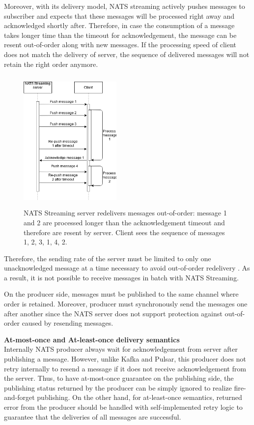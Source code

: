 Moreover, with its delivery model, NATS streaming actively pushes messages to subscriber and expects that these messages will be processed right away and acknowledged shortly after. Therefore, in case the consumption of a message takes longer time than the timeout for acknowledgement, the message can be resent out-of-order along with new messages. If the processing speed of client does not match the delivery of server, the sequence of delivered messages will not retain the right order anymore.
\begin{figure}[h]
	\centering
	\includegraphics[width=5cm,height=7cm]{images/order-nats.png}
	\caption{NATS Streaming server redelivers messages out-of-order: message 1 and 2 are processed longer than the acknowledgement timeout and therefore are resent by server. Client sees the sequence of messages 1, 2, 3, 1, 4, 2.}
	\label{fig:ordernats}
\end{figure}

Therefore, the sending rate of the server must be limited to only one unacknowledged message at a time necessary to avoid out-of-order redelivery \cite{natsdevelopingacks}. As a result, it is not possible to receive messages in batch with NATS Streaming. 

On the producer side, messages must be published to the same channel where order is retained. Moreover, producer must synchronously send the messages one after another since the NATS server does not support protection against out-of-order caused by resending messages.  

\textbf{At-most-once and At-least-once delivery semantics}\\
Internally NATS producer always wait for acknowledgement from server after publishing a message. However, unlike Kafka and Pulsar, this producer does not retry internally to resend a message if it does not receive acknowledgement from the server. Thus, to have at-most-once guarantee on the publishing side, the publishing status returned by the producer can be simply ignored to realize fire-and-forget publishing. On the other hand, for at-least-once semantics, returned error from the producer should be handled with self-implemented retry logic to guarantee that the deliveries of all messages are successful.

